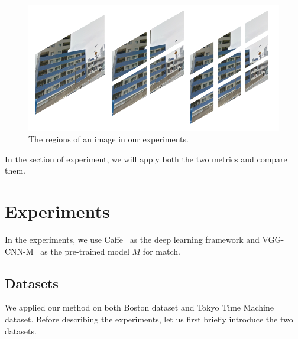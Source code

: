 \begin{figure}[htbp]
\includegraphics*[width=0.9\linewidth]{img/regions}
\caption{The regions of an image in our experiments.}
\label{fig:pyramid}
\end{figure}
\par
In the section of experiment, we will apply both the two metrics and compare them.

\section{Experiments}
\par
In the experiments, we use Caffe~\cite{jia2014caffe} as the deep learning framework and VGG-CNN-M~\cite{chatfield2014return} as the pre-trained model $M$ for match. 

\subsection{Datasets}
We applied our method on both Boston dataset and Tokyo Time Machine dataset. Before describing the experiments, let us first briefly introduce the two datasets. 

